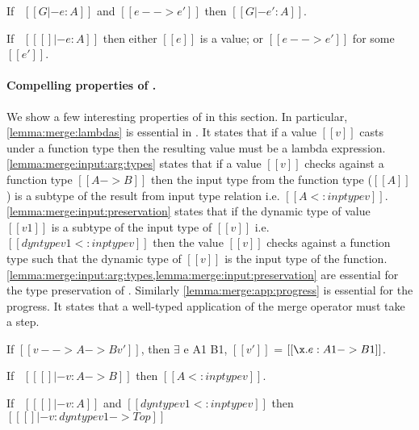 \begin{theorem}
\label{lemma:merge:preservation}
  If \ $[[G |- e : A]]$ and $[[e --> e']]$ then $[[G |- e' : A]]$.
\end{theorem}


\begin{theorem}[Progress]\label{lemma:merge:progress}
If \ $[[ [] |- e : A]]$ then either $[[e]]$ is a value;
or $[[e --> e']]$ for some $[[e']]$.
\end{theorem}


\paragraph{Compelling properties of \namems.}
We show a few interesting properties of \namems
in this section. In particular, \cref{lemma:merge:lambdas}
is essential in \namems. It states that if a value
$[[v]]$ casts under a function type then the resulting
value must be a lambda expression.
\cref{lemma:merge:input:arg:types} states that
if a value $[[v]]$ checks against a function type $[[A->B]]$
then the input type from the function type ($[[A]]$) is a subtype of
the result from input type relation i.e. $[[A <: inptype v]]$.
\cref{lemma:merge:input:preservation} states that if the dynamic type
of value $[[v1]]$ is a subtype of the input type of $[[v]]$
i.e. $[[dyntype v1 <: inptype v]]$ then the value $[[v]]$ checks
against a function type such that the dynamic type of $[[v]]$
is the input type of the function.
\cref{lemma:merge:input:arg:types,lemma:merge:input:preservation}
are essential for the type preservation of \namems.
Similarly \cref{lemma:merge:app:progress} is essential for
the progress. It states that a well-typed application of the merge
operator must take a step.


\begin{lemma}
  If $[[v -->A->B v']]$, then
  $\exists$ e A1 B1, $[[v']]$ = $[[\x.e:A1->B1]]$. 
\label{lemma:merge:lambdas}
\end{lemma}

\begin{lemma}
  If \ $[[ [] |- v : A->B]]$ then $[[A <: inptype v]]$.
  \label{lemma:merge:input:arg:types}
\end{lemma}

\begin{lemma}
  If \ $[[ [] |- v : A]]$ and $[[dyntype v1 <: inptype v]]$ then $[[ [] |- v : dyntype v1 -> Top]]$
  \label{lemma:merge:input:preservation}
\end{lemma}

